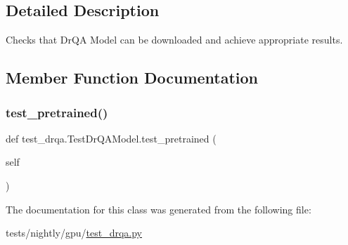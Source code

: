 \subsection{Detailed Description}
\begin{DoxyVerb}Checks that DrQA Model can be downloaded and achieve appropriate results.
\end{DoxyVerb}
 

\subsection{Member Function Documentation}
\mbox{\label{classtest__drqa_1_1TestDrQAModel_a7d1c0902015b2a1fb0d208e89c7adb93}} 
\subsubsection{\texorpdfstring{test\+\_\+pretrained()}{test\_pretrained()}}
{\footnotesize\ttfamily def test\+\_\+drqa.\+Test\+Dr\+Q\+A\+Model.\+test\+\_\+pretrained (\begin{DoxyParamCaption}\item[{}]{self }\end{DoxyParamCaption})}



The documentation for this class was generated from the following file\+:\begin{DoxyCompactItemize}
\item 
tests/nightly/gpu/\hyperlink{test__drqa_8py}{test\+\_\+drqa.\+py}\end{DoxyCompactItemize}
